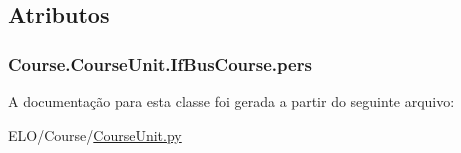 \subsection{Atributos}
\hypertarget{classCourse_1_1CourseUnit_1_1IfBusCourse_ab926ae8fb127b7697e2b63025df09a78}{
\subsubsection[{pers}]{\setlength{\rightskip}{0pt plus 5cm}Course.\-Course\-Unit.\-If\-Bus\-Course.\-pers}}\label{classCourse_1_1CourseUnit_1_1IfBusCourse_ab926ae8fb127b7697e2b63025df09a78}


A documentação para esta classe foi gerada a partir do seguinte arquivo\-:\begin{DoxyCompactItemize}
\item 
E\-L\-O/\-Course/\hyperlink{CourseUnit_8py}{Course\-Unit.\-py}\end{DoxyCompactItemize}

